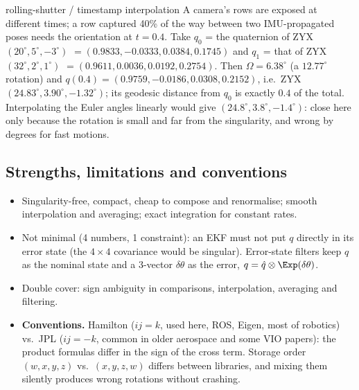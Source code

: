 \begin{example}{rolling-shutter / timestamp interpolation}
A camera's rows are exposed at different times; a row captured 40\% of the way between two IMU-propagated poses needs the orientation at $t=0.4$. Take $q_0$ = the quaternion of ZYX $(20^\circ,5^\circ,-3^\circ)$ $=(0.9833,-0.0333,0.0384,0.1745)$ and $q_1$ = that of ZYX $(32^\circ,2^\circ,1^\circ)$ $=(0.9611,0.0036,0.0192,0.2754)$. Then $\Omega=6.38^\circ$ (a $12.77^\circ$ rotation) and $q(0.4)=(0.9759,-0.0186,0.0308,0.2152)$, i.e.\ ZYX $(24.83^\circ,3.90^\circ,-1.32^\circ)$; its geodesic distance from $q_0$ is exactly $0.4$ of the total. Interpolating the Euler angles linearly would give $(24.8^\circ,3.8^\circ,-1.4^\circ)$: close here only because the rotation is small and far from the singularity, and wrong by degrees for fast motions.
\end{example}

\subsection{Strengths, limitations and conventions}\label{sec:rot:strengths-limitations-conventions}
\begin{itemize}
\item[$+$] Singularity-free, compact, cheap to compose and renormalise; smooth interpolation and averaging; exact integration for constant rates.
\item[$-$] Not minimal (4 numbers, 1 constraint): an EKF must not put $q$ directly in its error state (the $4\times4$ covariance would be singular). Error-state filters keep $q$ as the nominal state and a 3-vector $\delta\theta$ as the error, $q=\hat q\otimes\Exp(\delta\theta)$.
\item[$-$] Double cover: sign ambiguity in comparisons, interpolation, averaging and filtering.
\item[$!$] \textbf{Conventions.} Hamilton ($ij=k$, used here, ROS, Eigen, most of robotics) vs.\ JPL ($ij=-k$, common in older aerospace and some VIO papers): the product formulas differ in the sign of the cross term. Storage order $(w,x,y,z)$ vs.\ $(x,y,z,w)$ differs between libraries, and mixing them silently produces wrong rotations without crashing.
\end{itemize}
